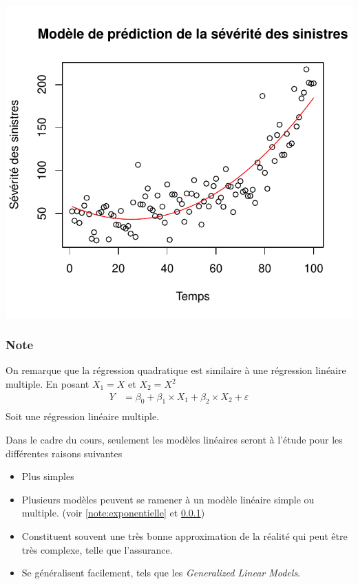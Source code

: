 \documentclass[11pt,french]{report}
\begin{document}
\includegraphics{notes_de_cours-004}

\subsubsection{Note}
\label{note:quadratique}
On remarque que la régression quadratique est similaire à une régression linéaire multiple. En posant $X_1=X$ et $X_2 = X^2$
\begin{align*}
Y &= \beta_0 + \beta_1 \times X_1 + \beta_2 \times X_2 + \varepsilon\\
\end{align*}
Soit une régression linéaire multiple.\newline

Dans le cadre du cours, seulement les modèles linéaires seront à l'étude pour les différentes raisons suivantes

\bigskip
\begin{itemize}
\item Plus simples
\item Plusieurs modèles peuvent se ramener à un modèle linéaire simple ou multiple. (voir \ref{note:exponentielle} et \ref{note:quadratique})
\item Constituent souvent une très bonne approximation de la réalité qui peut être très complexe, telle que l'assurance.
\item Se généralisent facilement, tels que les \textit{Generalized Linear Models}.
\end{itemize}
\bigskip
\end{document}
